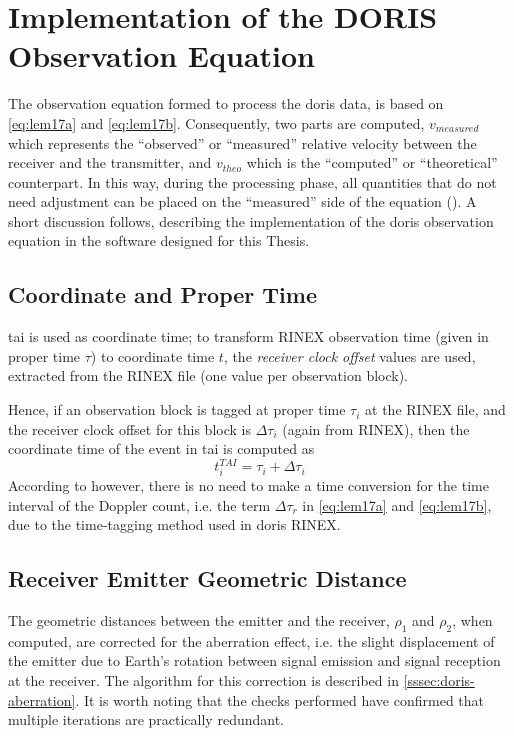 \section{Implementation of the DORIS Observation Equation}\label{sec:doris-observation-equation-implementation}

The observation equation formed to process the \gls{doris} data, is based on 
\autoref{eq:lem17a} and \autoref{eq:lem17b}. Consequently, two parts are computed, $v_{measured}$ which 
represents the ``observed'' or ``measured'' relative velocity between the receiver 
and the transmitter, and $v_{theo}$ which is the ``computed'' or ``theoretical'' 
counterpart. In this way, during the processing phase, all quantities that do not 
need adjustment can be placed on the ``measured'' side of the equation 
(\cite{Lemoine2016}). A short discussion follows, describing the implementation 
of the \gls{doris} observation equation in the software designed for this Thesis.

\subsection{Coordinate and Proper Time}\label{ssec:coordinate-proper-time}
\gls{tai} is used as coordinate time; to transform RINEX observation time (given in 
proper time $\tau$) to coordinate time $t$, the \emph{receiver clock offset} values 
are used, extracted from the RINEX file (one value per observation block).

Hence, if an observation block is tagged at proper time $\tau _i$ at the RINEX 
file, and the receiver clock offset for this block is $\Delta \tau _i$ (again from 
RINEX), then the coordinate time of the event in \gls{tai} is computed as
\begin{equation}
  t^{TAI}_i = \tau _i + \Delta \tau _i
\end{equation}
According to \cite{Lemoine2016} however, there is no need to make a time conversion 
for the time interval of the Doppler count, i.e. the term $\Delta \tau _r$ in 
\autoref{eq:lem17a} and \autoref{eq:lem17b}, due to the time-tagging method used in \gls{doris} RINEX.

\subsection{Receiver Emitter Geometric Distance}
The geometric distances between the emitter and the receiver, $\rho _1$ and $\rho _2$, 
when computed, are corrected for the aberration effect, i.e. the slight displacement of 
the emitter due to Earth's rotation between signal emission and signal reception at
the receiver. The algorithm for this correction is described in \autoref{sssec:doris-aberration}.
It is worth noting that the checks performed have confirmed that multiple iterations 
are practically redundant.

